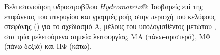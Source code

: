 \begin{figure}[h!]
\begin{minipage}[b]{0.5\linewidth}
\end{minipage}
\begin{minipage}[b]{1\linewidth}
 \centering
\end{minipage}
\caption{Βελτιστοποίηση  υδροστροβίλου $Hydromatrix\circledR$: Ισοβαρείς επί της επιφάνειας του πτερυγίου και γραμμές ροής στην περιοχή του κελύφους στεφάνης () για το σχεδιασμό Α, μέλους του υπολογισθέντος μετώπου , στα τρία μελετούμενα σημεία λειτουργίας, ΜΑ (πάνω-αριστερά), ΜΦ (πάνω-δεξιά) και ΠΦ (κάτω).}
\label{Matrix-A-2}
\end{figure}


